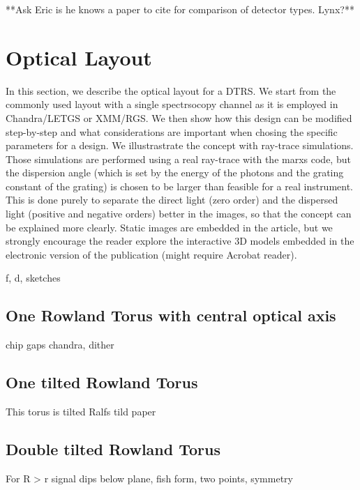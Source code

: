 \documentclass[linenumbers]{aastex631}
\begin{document}
{{**Ask Eric is he knows a paper to cite for comparison of detector types. Lynx?**

\section{Optical Layout}
In this section, we describe the optical layout for a DTRS. We start from the commonly used layout with a single spectrsocopy channel as it is employed in Chandra/LETGS or XMM/RGS. We then show how this design can be modified step-by-step and what considerations are important when chosing the specific parameters for a design. We illustrastrate the concept with ray-trace simulations. Those simulations are performed using a real ray-trace with the marxs code, but the dispersion angle (which is set by the energy of the photons and the grating constant of the grating) is chosen to be larger than feasible for a real instrument. This is done purely to separate the direct light (zero order) and the dispersed light (positive and negative orders) better in the images, so that the concept can be explained more clearly. Static images are embedded in the article, but we strongly encourage the reader explore the interactive 3D models embedded in the electronic version of the publication (might require Acrobat reader).

f, d, sketches

\subsection{One Rowland Torus with central optical axis}
\label{sect:onetorus}
chip gaps chandra, dither


\subsection{One tilted Rowland Torus}


This torus is tilted Ralfs tild paper
\cite{doi:10.1117/12.856482}

\subsection{Double tilted Rowland Torus}
For R > r signal dips below plane, fish form, two points, symmetry

}}
\end{document}
